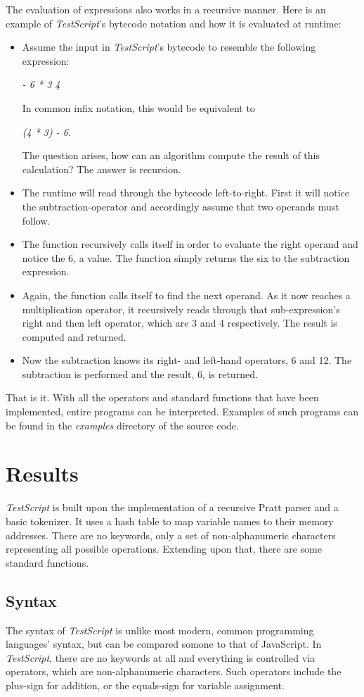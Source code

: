 \documentclass[12pt,a4paper]{article}
\newcommand{\expr}[1] {
    \begin{center}
        #1
    \end{center}
}
\newcommand{\name}{\emph{TestScript}}
\begin{document}
The evaluation of expressions also works in a recursive manner. Here is an 
example of \name{}'s bytecode notation and how it is evaluated at runtime:
\begin{itemize}
    \item Assume the input in \name{}'s bytecode to resemble the following expression: 
        \expr{\emph{- 6 * 3 4}}
        In common infix notation, this would be equivalent to 
        \expr{\emph{(4 * 3) - 6}.}
        The question arises, how can an algorithm compute the result of this
        calculation? The answer is recursion.
    \item The runtime will read through the bytecode left-to-right. First it will
        notice the subtraction-operator and accordingly assume that two
        operands must follow.
    \item The function recursively calls itself in order to evaluate the
        right operand and notice the 6, a value. The function simply returns the six
        to the subtraction expression.
    \item Again, the function calls itself to find the next operand.
        As it now reaches a multiplication operator,
        it recursively reads through that sub-expression's right and then left
        operator, which are 3 and 4 respectively.
        The result is computed and returned.
    \item Now the subtraction knows its right- and left-hand operators, 6 and 12.
        The subtraction is performed and the result, 6, is returned.
\end{itemize}

That is it. With all the operators and standard functions that have been implemented, entire programs
can be interpreted. Examples of such programs can be found in the \emph{examples} directory
of the source code.

\section{Results}

\name{} is built upon the implementation of a recursive Pratt
parser and a basic tokenizer. It uses a hash table to map variable names to their
memory addresses. There are no keywords, only a set of non-alphanumeric characters
representing all possible operations. Extending upon that, there are some
standard functions.

\subsection{Syntax}
The syntax of \name{} is unlike most modern, common programming languages' syntax,
but can be compared somone to that of JavaScript.
In \name{}, there are no keywords at all and everything is controlled via operators,
which are non-alphanumeric characters. Such operators include the plus-sign 
for addition, or the equals-sign for variable assignment.
\end{document}
